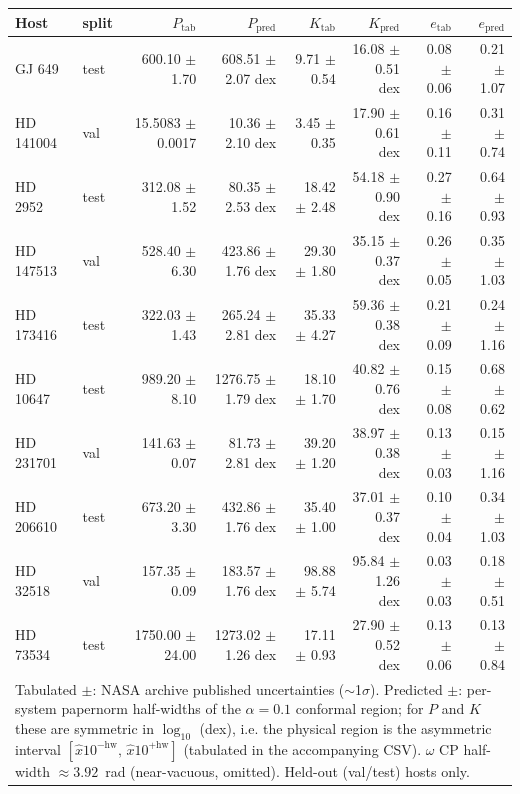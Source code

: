 \begin{tabular}{llrrrrrr}
\hline
Host & split & $P_{\mathrm{tab}}$ & $P_{\mathrm{pred}}$ & $K_{\mathrm{tab}}$ & $K_{\mathrm{pred}}$ & $e_{\mathrm{tab}}$ & $e_{\mathrm{pred}}$ \\
\hline
GJ 649 & test & 600.10 $\pm$ 1.70 & 608.51 $\pm$ 2.07 dex & 9.71 $\pm$ 0.54 & 16.08 $\pm$ 0.51 dex & 0.08 $\pm$ 0.06 & 0.21 $\pm$ 1.07 \\
HD 141004 & val & 15.5083 $\pm$ 0.0017 & 10.36 $\pm$ 2.10 dex & 3.45 $\pm$ 0.35 & 17.90 $\pm$ 0.61 dex & 0.16 $\pm$ 0.11 & 0.31 $\pm$ 0.74 \\
HD 2952 & test & 312.08 $\pm$ 1.52 & 80.35 $\pm$ 2.53 dex & 18.42 $\pm$ 2.48 & 54.18 $\pm$ 0.90 dex & 0.27 $\pm$ 0.16 & 0.64 $\pm$ 0.93 \\
HD 147513 & val & 528.40 $\pm$ 6.30 & 423.86 $\pm$ 1.76 dex & 29.30 $\pm$ 1.80 & 35.15 $\pm$ 0.37 dex & 0.26 $\pm$ 0.05 & 0.35 $\pm$ 1.03 \\
HD 173416 & test & 322.03 $\pm$ 1.43 & 265.24 $\pm$ 2.81 dex & 35.33 $\pm$ 4.27 & 59.36 $\pm$ 0.38 dex & 0.21 $\pm$ 0.09 & 0.24 $\pm$ 1.16 \\
HD 10647 & test & 989.20 $\pm$ 8.10 & 1276.75 $\pm$ 1.79 dex & 18.10 $\pm$ 1.70 & 40.82 $\pm$ 0.76 dex & 0.15 $\pm$ 0.08 & 0.68 $\pm$ 0.62 \\
HD 231701 & val & 141.63 $\pm$ 0.07 & 81.73 $\pm$ 2.81 dex & 39.20 $\pm$ 1.20 & 38.97 $\pm$ 0.38 dex & 0.13 $\pm$ 0.03 & 0.15 $\pm$ 1.16 \\
HD 206610 & test & 673.20 $\pm$ 3.30 & 432.86 $\pm$ 1.76 dex & 35.40 $\pm$ 1.00 & 37.01 $\pm$ 0.37 dex & 0.10 $\pm$ 0.04 & 0.34 $\pm$ 1.03 \\
HD 32518 & val & 157.35 $\pm$ 0.09 & 183.57 $\pm$ 1.76 dex & 98.88 $\pm$ 5.74 & 95.84 $\pm$ 1.26 dex & 0.03 $\pm$ 0.03 & 0.18 $\pm$ 0.51 \\
HD 73534 & test & 1750.00 $\pm$ 24.00 & 1273.02 $\pm$ 1.26 dex & 17.11 $\pm$ 0.93 & 27.90 $\pm$ 0.52 dex & 0.13 $\pm$ 0.06 & 0.13 $\pm$ 0.84 \\
\hline
\multicolumn{8}{l}{\footnotesize Tabulated $\pm$: NASA archive published uncertainties ($\sim$1$\sigma$). Predicted $\pm$: per-system papernorm half-widths of the $\alpha{=}0.1$ conformal region; for $P$ and $K$ these are symmetric in $\log_{10}$ (dex), i.e. the physical region is the asymmetric interval $[\hat{x}10^{-\mathrm{hw}},\,\hat{x}10^{+\mathrm{hw}}]$ (tabulated in the accompanying CSV). $\omega$ CP half-width $\approx3.92$~rad (near-vacuous, omitted). Held-out (val/test) hosts only.} \\
\end{tabular}
